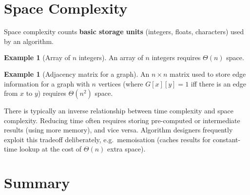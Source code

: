 \documentclass[11pt, a4paper, notitlepage]{report}
\theoremstyle{definition}
\theoremstyle{remark}
\theoremstyle{definition}
\newtheorem{example}[theorem]{Example}
\begin{document}
\section{Space Complexity}
\label{sec:space-complexity}

Space complexity counts \textbf{basic storage units} (integers, floats,
characters) used by an algorithm.

\begin{example}[Array of $n$ integers]
\label{ex:space-array}
An array of $n$ integers requires $\Theta(n)$ space.
\end{example}

\begin{example}[Adjacency matrix for a graph]
\label{ex:space-matrix}
An $n \times n$ matrix used to store edge information for a graph with $n$
vertices (where $G[x][y] = 1$ iff there is an edge from $x$ to $y$) requires
$\Theta(n^2)$ space.
\end{example}

\begin{keyresult}[title={Space--Time Tradeoff Principle}]
There is typically an inverse relationship between time complexity and space
complexity.  Reducing time often requires storing pre-computed or intermediate
results (using more memory), and vice versa.  Algorithm designers frequently
exploit this tradeoff deliberately, e.g.\ memoisation (caches results for
constant-time lookup at the cost of $\Theta(n)$ extra space).
\end{keyresult}

\section{Summary}
\label{sec:aoa-summary}
\end{document}
